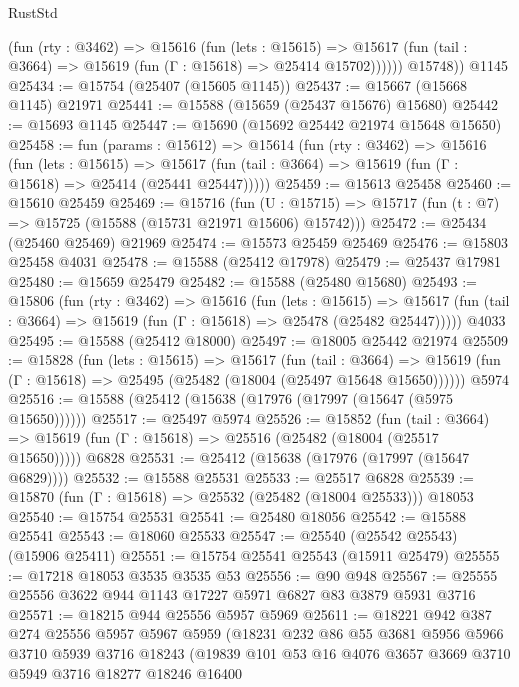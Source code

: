 \begin{lexlean}{RustStd}
\begin{coremodule}
            (fun (rty : @3462) =>
            @15616
              (fun (lets : @15615) =>
              @15617 (fun (tail : @3664) => @15619 (fun (Γ : @15618) => @25414 @15702))))))
        @15748))
    @1145
@25434 := @15754 (@25407 (@15605 @1145))
@25437 := @15667 (@15668 @1145) @21971
@25441 := @15588 (@15659 (@25437 @15676) @15680)
@25442 := @15693 @1145
@25447 := @15690 (@15692 @25442 @21974 @15648 @15650)
@25458 := fun (params : @15612) =>
  @15614
    (fun (rty : @3462) =>
    @15616
      (fun (lets : @15615) =>
      @15617 (fun (tail : @3664) => @15619 (fun (Γ : @15618) => @25414 (@25441 @25447)))))
@25459 := @15613 @25458
@25460 := @15610 @25459
@25469 := @15716
    (fun (U : @15715) => @15717 (fun (t : @7) => @15725 (@15588 (@15731 @21971 @15606) @15742)))
@25472 := @25434 (@25460 @25469) @21969
@25474 := @15573 @25459 @25469
@25476 := @15803 @25458 @4031
@25478 := @15588 (@25412 @17978)
@25479 := @25437 @17981
@25480 := @15659 @25479
@25482 := @15588 (@25480 @15680)
@25493 := @15806
    (fun (rty : @3462) =>
    @15616
      (fun (lets : @15615) =>
      @15617 (fun (tail : @3664) => @15619 (fun (Γ : @15618) => @25478 (@25482 @25447)))))
    @4033
@25495 := @15588 (@25412 @18000)
@25497 := @18005 @25442 @21974
@25509 := @15828
    (fun (lets : @15615) =>
    @15617
      (fun (tail : @3664) =>
      @15619 (fun (Γ : @15618) => @25495 (@25482 (@18004 (@25497 @15648 @15650))))))
    @5974
@25516 := @15588 (@25412 (@15638 (@17976 (@17997 (@15647 (@5975 @15650))))))
@25517 := @25497 @5974
@25526 := @15852
    (fun (tail : @3664) => @15619 (fun (Γ : @15618) => @25516 (@25482 (@18004 (@25517 @15650)))))
    @6828
@25531 := @25412 (@15638 (@17976 (@17997 (@15647 @6829))))
@25532 := @15588 @25531
@25533 := @25517 @6828
@25539 := @15870 (fun (Γ : @15618) => @25532 (@25482 (@18004 @25533))) @18053
@25540 := @15754 @25531
@25541 := @25480 @18056
@25542 := @15588 @25541
@25543 := @18060 @25533
@25547 := @25540 (@25542 @25543) (@15906 @25411)
@25551 := @15754 @25541 @25543 (@15911 @25479)
@25555 := @17218 @18053 @3535 @3535 @53
@25556 := @90 @948
@25567 := @25555 @25556 @3622 @944 @1143 @17227 @5971 @6827 @83 @3879 @5931 @3716
@25571 := @18215 @944 @25556 @5957 @5969
@25611 := @18221
    @942
    @387
    @274
    @25556
    @5957
    @5967
    @5959
    (@18231
      @232
      @86
      @55
      @3681
      @5956
      @5966
      @3710
      @5939
      @3716
      @18243
      (@19839
        @101
        @53
        @16
        @4076
        @3657
        @3669
        @3710
        @5949
        @3716
        @18277
        @18246
        @16400

\end{coremodule}
\end{lexlean}
